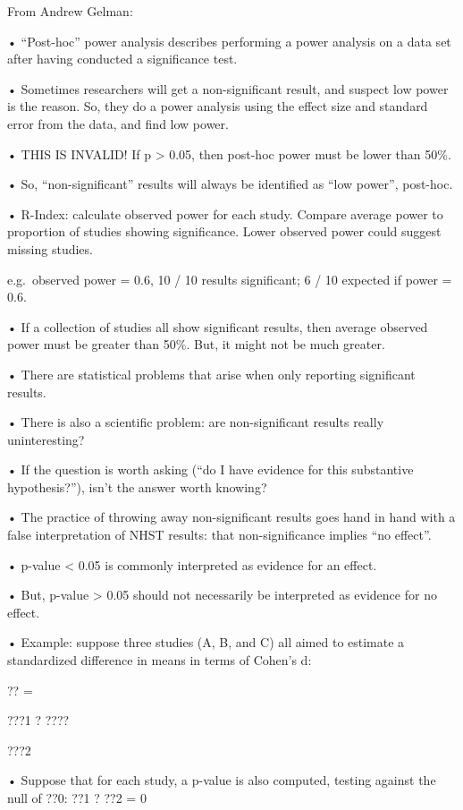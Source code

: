 \documentclass[
  letterpaper,
  DIV=11,
  numbers=noendperiod]{scrreprt}
\begin{document}
From Andrew Gelman:

• ``Post-hoc'' power analysis describes performing a power analysis on a
data set after having conducted a significance test.

• Sometimes researchers will get a non-significant result, and suspect
low power is the reason. So, they do a power analysis using the effect
size and standard error from the data, and find low power.

• THIS IS INVALID! If p \textgreater{} 0.05, then post-hoc power must be
lower than 50\%.

• So, ``non-significant'' results will always be identified as ``low
power'', post-hoc.

• R-Index: calculate observed power for each study. Compare average
power to proportion of studies showing significance. Lower observed
power could suggest missing studies.

e.g.~observed power = 0.6, 10 / 10 results significant; 6 / 10 expected
if power = 0.6.

• If a collection of studies all show significant results, then average
observed power must be greater than 50\%. But, it might not be much
greater.

• There are statistical problems that arise when only reporting
significant results.

• There is also a scientific problem: are non-significant results really
uninteresting?

• If the question is worth asking (``do I have evidence for this
substantive hypothesis?''), isn't the answer worth knowing?

• The practice of throwing away non-significant results goes hand in
hand with a false interpretation of NHST results: that non-significance
implies ``no effect''.

• p-value \textless{} 0.05 is commonly interpreted as evidence for an
effect.

• But, p-value \textgreater{} 0.05 should not necessarily be interpreted
as evidence for no effect.

• Example: suppose three studies (A, B, and C) all aimed to estimate a
standardized difference in means in terms of Cohen's d:

?? =

???1 ? ????

???2

• Suppose that for each study, a p-value is also computed, testing
against the null of ??0: ??1 ? ??2 = 0
\end{document}
